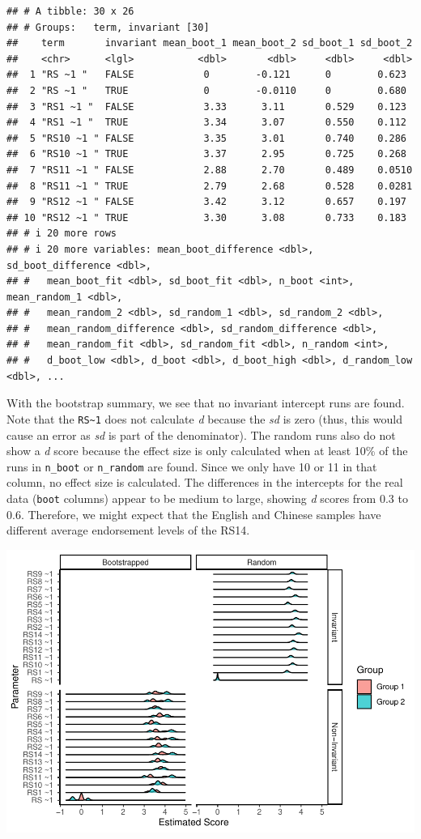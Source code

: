 \documentclass[
  man]{apa7}
\begin{document}
\begin{verbatim}
## # A tibble: 30 x 26
## # Groups:   term, invariant [30]
##    term       invariant mean_boot_1 mean_boot_2 sd_boot_1 sd_boot_2
##    <chr>      <lgl>           <dbl>       <dbl>     <dbl>     <dbl>
##  1 "RS ~1 "   FALSE            0        -0.121      0        0.623 
##  2 "RS ~1 "   TRUE             0        -0.0110     0        0.680 
##  3 "RS1 ~1 "  FALSE            3.33      3.11       0.529    0.123 
##  4 "RS1 ~1 "  TRUE             3.34      3.07       0.550    0.112 
##  5 "RS10 ~1 " FALSE            3.35      3.01       0.740    0.286 
##  6 "RS10 ~1 " TRUE             3.37      2.95       0.725    0.268 
##  7 "RS11 ~1 " FALSE            2.88      2.70       0.489    0.0510
##  8 "RS11 ~1 " TRUE             2.79      2.68       0.528    0.0281
##  9 "RS12 ~1 " FALSE            3.42      3.12       0.657    0.197 
## 10 "RS12 ~1 " TRUE             3.30      3.08       0.733    0.183 
## # i 20 more rows
## # i 20 more variables: mean_boot_difference <dbl>, sd_boot_difference <dbl>,
## #   mean_boot_fit <dbl>, sd_boot_fit <dbl>, n_boot <int>, mean_random_1 <dbl>,
## #   mean_random_2 <dbl>, sd_random_1 <dbl>, sd_random_2 <dbl>,
## #   mean_random_difference <dbl>, sd_random_difference <dbl>,
## #   mean_random_fit <dbl>, sd_random_fit <dbl>, n_random <int>,
## #   d_boot_low <dbl>, d_boot <dbl>, d_boot_high <dbl>, d_random_low <dbl>, ...
\end{verbatim}

With the bootstrap summary, we see that no invariant intercept runs are found. Note that the \texttt{RS\textasciitilde{}1} does not calculate \emph{d} because the \emph{sd} is zero (thus, this would cause an error as \emph{sd} is part of the denominator). The random runs also do not show a \emph{d} score because the effect size is only calculated when at least 10\% of the runs in \texttt{n\_boot} or \texttt{n\_random} are found. Since we only have 10 or 11 in that column, no effect size is calculated. The differences in the intercepts for the real data (\texttt{boot} columns) appear to be medium to large, showing \emph{d} scores from 0.3 to 0.6. Therefore, we might expect that the English and Chinese samples have different average endorsement levels of the RS14.

\includegraphics{manuscript_files/figure-latex/unnamed-chunk-110-1.pdf}
\end{document}
